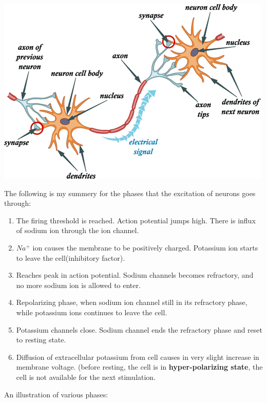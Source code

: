 \includegraphics[scale=0.8]{graphics/NeuronSignal}

The following is my summery for the phases that the excitation of neurons goes through:
\begin{enumerate}
  \item The firing threshold is reached. Action potential jumps high. There is influx of sodium ion through the ion channel.
  \item $Na^{+}$ ion causes the membrane to be positively charged. Potassium ion starts to leave the cell(inhibitory factor).
  \item Reaches peak in action potential. Sodium channels becomes refractory, and no more sodium ion is allowed to enter.
  \item Repolarizing phase, when sodium ion channel still in its refractory phase, while potassium ions continues to leave the cell.
  \item Potassium channels close. Sodium channel ends the refractory phase and reset to resting state.
  \item Diffusion of extracellular potassium from cell causes in very slight increase in membrane voltage. (before resting, the cell is in 
	\textbf{hyper-polarizing state}, the cell is not available for the next stimulation.
\end{enumerate}

An illustration of various phases:

